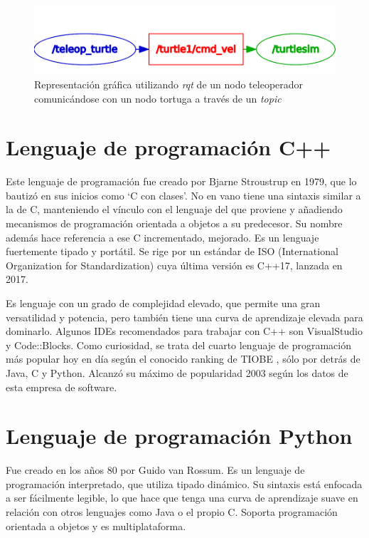\documentclass[12pt,spanish,chapterprefix, numbers=noenddot]{book}
\numberwithin{equation}{section}
\numberwithin{figure}{section}
\begin{document}
\begin{figure}[hbt!]
\centering
\includegraphics[width=12cm]{Figs/turtle_graph.png}
\par
\caption{\label{fig:turtlesim}Representación gráfica utilizando \textit{rqt} de un nodo teleoperador comunicándose con un nodo tortuga a través de un \textit{topic}}
\end{figure}

\section{Lenguaje de programación C++}
Este lenguaje de programación fue creado por Bjarne Stroustrup en 1979, que lo bautizó en sus inicios como ‘C con clases’. No en vano tiene una sintaxis similar a la de C, manteniendo el vínculo con el lenguaje del que proviene y añadiendo mecanismos de programación orientada a objetos a su predecesor. Su nombre además hace referencia a ese C incrementado, mejorado. 
Es un lenguaje fuertemente tipado y portátil. Se rige por un estándar de ISO (International Organization for Standardization) cuya última versión es C++17, lanzada en 2017. 

Es lenguaje con un grado de complejidad elevado, que permite una gran versatilidad y potencia, pero también tiene una curva de aprendizaje elevada para dominarlo.
Algunos IDEs recomendados para trabajar con C++ son VisualStudio y Code::Blocks. 
Como curiosidad, se trata del cuarto lenguaje de programación más popular hoy en día según el conocido ranking de TIOBE \cite{tiobe}, sólo por detrás de Java, C y Python. Alcanzó su máximo de popularidad 2003 según los datos de esta empresa de software. 

\section{Lenguaje de programación Python}
Fue creado en los años 80 por Guido van Rossum. Es un lenguaje de programación interpretado, que utiliza tipado dinámico. Su sintaxis está enfocada a ser fácilmente legible, lo que hace que tenga una curva de aprendizaje suave en relación con otros lenguajes como Java o el propio C. Soporta programación orientada a objetos y es multiplataforma.
\end{document}
